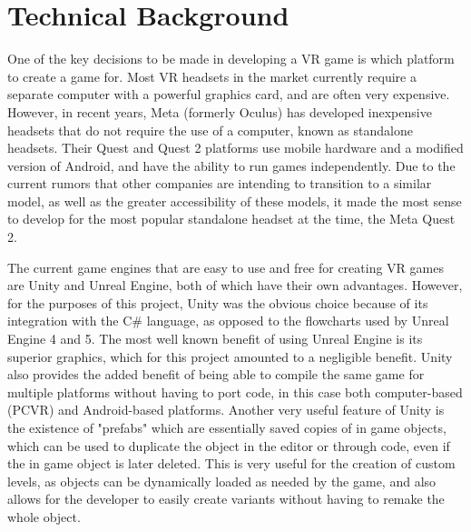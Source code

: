 \documentclass[10pt,twocolumn]{article}
\begin{document}
\section{Technical Background}

\iffalse
Some notes:
FOr technical background to talk about:

First of all, designed specifically for an standalone headset
-> This means keeping in mind the lower powered processors and GPUs that are available
-> Have to write code relatively efficiently

Using Unity
-> Meta has a package that 

\fi
One of the key decisions to be made in developing a VR game is which platform to create a game for. Most VR headsets in the market currently require a separate computer with a powerful graphics card, and are often very expensive. However, in recent years, Meta (formerly Oculus) has developed inexpensive headsets that do not require the use of a computer, known as standalone headsets. Their Quest and Quest 2 platforms use mobile hardware and a modified version of Android, and have the ability to run games independently. Due to the current rumors that other companies are intending to transition to a similar model\cite{FutureStandalone}, as well as the greater accessibility of these models, it made the most sense to develop for the most popular standalone headset at the time, the Meta Quest 2.

The current game engines that are easy to use and free for creating VR games are Unity and Unreal Engine, both of which have their own advantages. However, for the purposes of this project, Unity was the obvious choice because of its integration with the C\# language, as opposed to the flowcharts used by Unreal Engine 4 and 5. The most well known benefit of using Unreal Engine is its superior graphics, which for this project amounted to a negligible benefit. Unity also provides the added benefit of being able to compile the same game for multiple platforms without having to port code, in this case both computer-based (PCVR) and Android-based platforms. Another very useful feature of Unity is the existence of "prefabs" which are essentially saved copies of in game objects, which can be used to duplicate the object in the editor or through code, even if the in game object is later deleted. This is very useful for the creation of custom levels, as objects can be dynamically loaded as needed by the game, and also allows for the developer to easily create variants without having to remake the whole object.
\end{document}
